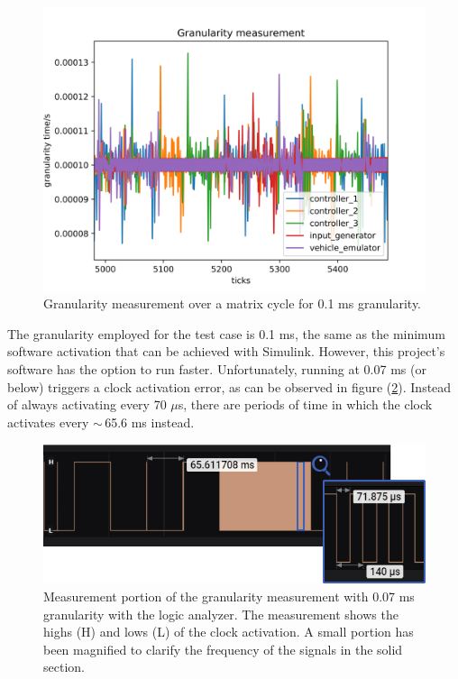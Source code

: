 \documentclass[table,xcdraw]{article}
\begin{document}
\begin{figure}[h!]
    \centering
    \includegraphics[scale=0.75]{figures/results/granularity_measurement_0_1ms.png}
    \caption{Granularity measurement over a matrix cycle for 0.1 ms granularity.}
    \label{fig:granularity_measurement}
\end{figure}

The granularity employed for the test case is 0.1 ms, the same as the minimum software activation that can be achieved with Simulink. However, this project's software has the option to run faster. Unfortunately, running at 0.07 ms (or below) triggers a clock activation error, as can be observed in figure (\ref{fig:clock_lag_activation}). Instead of always activating every 70 $\mu$s, there are periods of time in which the clock activates every $\sim\,$65.6 ms instead.

\begin{figure}[h!]
    \centering
    \includegraphics[scale = 0.4]{figures/results/clock_lag_activation.jpg}
    \caption{Measurement portion of the granularity measurement with 0.07 ms granularity with the logic analyzer. The measurement shows the highs (H) and lows (L) of the clock activation. A small portion has been magnified to clarify the frequency of the signals in the solid section.}
    \label{fig:clock_lag_activation}
\end{figure}
\end{document}
